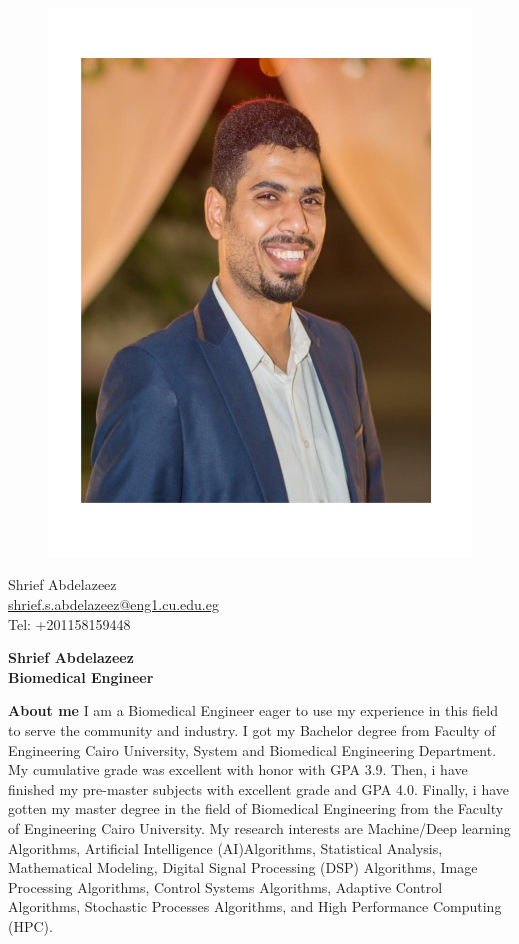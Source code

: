 \documentclass[a4paper,12pt,final]{memoir}
\newcommand{\Sep}{\vspace{1.5em}}
\newenvironment{AboutMe}
	{\ignorespaces\textbf{\color{RoyalBlue} About me}}
	{\Sep\ignorespacesafterend}
\begin{document}
\begin{figure}
	\hfill
	\includegraphics[width=0.6\columnwidth]{photo.pdf}
	\vspace{-7cm}
\end{figure}

\begin{flushright}\Small
	Shrief Abdelazeez \\
	\url{shrief.s.abdelazeez@eng1.cu.edu.eg}  \\
     Tel: +201158159448
\end{flushright}\normalsize
\framebreak


\Huge\bfseries {\color{RoyalBlue} Shrief Abdelazeez} \\
\Large\bfseries  Biomedical Engineer \\

\normalsize\normalfont

\begin{AboutMe}
I am a Biomedical Engineer eager to use my experience in this field to serve the community and industry. I got my Bachelor degree from Faculty of Engineering Cairo University, System and Biomedical Engineering Department. My cumulative grade was excellent with honor with GPA 3.9. Then, i have finished my pre-master subjects with excellent grade and GPA 4.0. Finally, i have gotten my master degree in the field of Biomedical Engineering from the Faculty of Engineering Cairo University. My research interests are Machine/Deep learning Algorithms, Artificial Intelligence (AI)Algorithms, Statistical Analysis, Mathematical Modeling, Digital Signal Processing (DSP) Algorithms, Image Processing Algorithms, Control Systems Algorithms, Adaptive Control Algorithms, Stochastic Processes Algorithms, and High Performance Computing (HPC).
\end{AboutMe}
\end{document}
